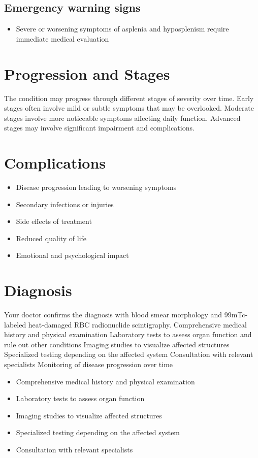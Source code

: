\subsection{Emergency warning signs}
\begin{itemize}[noitemsep]
  \item Severe or worsening symptoms of asplenia and hyposplenism require immediate medical evaluation
\end{itemize}
\section{Progression and Stages}
The condition may progress through different stages of severity over time. Early stages often involve mild or subtle symptoms that may be overlooked. Moderate stages involve more noticeable symptoms affecting daily function. Advanced stages may involve significant impairment and complications.
\section{Complications}
\begin{itemize}[noitemsep]
  \item Disease progression leading to worsening symptoms
  \item Secondary infections or injuries
  \item Side effects of treatment
  \item Reduced quality of life
  \item Emotional and psychological impact
\end{itemize}
\section{Diagnosis}
Your doctor confirms the diagnosis with blood smear morphology and 99mTc-labeled heat-damaged RBC radionuclide scintigraphy. Comprehensive medical history and physical examination Laboratory tests to assess organ function and rule out other conditions Imaging studies to visualize affected structures Specialized testing depending on the affected system Consultation with relevant specialists Monitoring of disease progression over time

\begin{itemize}[noitemsep]
  \item Comprehensive medical history and physical examination
  \item Laboratory tests to assess organ function
  \item Imaging studies to visualize affected structures
  \item Specialized testing depending on the affected system
  \item Consultation with relevant specialists
\end{itemize}
